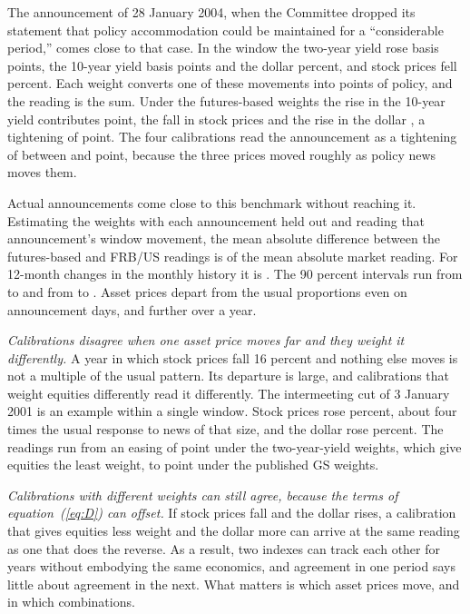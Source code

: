 The announcement of 28 January 2004, when the Committee dropped its statement that policy accommodation could be maintained for a ``considerable period,'' comes close to that case. In the window the two-year yield rose  basis points, the 10-year yield  basis points and the dollar  percent, and stock prices fell  percent. Each weight converts one of these movements into points of policy, and the reading is the sum. Under the futures-based weights the rise in the 10-year yield contributes  point, the fall in stock prices  and the rise in the dollar , a tightening of  point. The four calibrations read the announcement as a tightening of between  and  point, because the three prices moved roughly as policy news moves them.

Actual announcements come close to this benchmark without reaching it. Estimating the weights with each announcement held out and reading that announcement's window movement, the mean absolute difference between the futures-based and FRB/US readings is  of the mean absolute market reading. For 12-month changes in the monthly history it is . The 90 percent intervals run from  to  and from  to . Asset prices depart from the usual proportions even on announcement days, and further over a year.

\textit{Calibrations disagree when one asset price moves far and they weight it differently.} A year in which stock prices fall 16 percent and nothing else moves is not a multiple of the usual pattern. Its departure is large, and calibrations that weight equities differently read it differently. The intermeeting cut of 3 January 2001 is an example within a single window. Stock prices rose  percent, about four times the usual response to news of that size, and the dollar rose  percent. The readings run from an easing of  point under the two-year-yield weights, which give equities the least weight, to  point under the published GS weights.

\textit{Calibrations with different weights can still agree, because the terms of equation~(\ref{eq:D}) can offset.} If stock prices fall and the dollar rises, a calibration that gives equities less weight and the dollar more can arrive at the same reading as one that does the reverse. As a result, two indexes can track each other for years without embodying the same economics, and agreement in one period says little about agreement in the next. What matters is which asset prices move, and in which combinations.
\FloatBarrier

